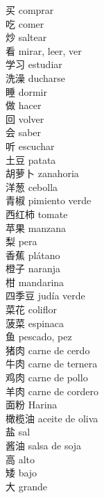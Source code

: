 \documentclass[13pt]{article}
\begin{document}

\begin{CJK*}{UTF8}{gkai}
\begin{multicols}{2}
\begin{pinyinscope}
\LARGE
\noindent
买 \quad comprar\\
吃 \quad comer\\
炒 \quad saltear\\
看 \quad mirar, leer, ver\\
学习 \quad estudiar\\
洗澡 \quad ducharse\\
睡 \quad dormir\\
做 \quad hacer\\
回 \quad volver\\
会 \quad saber\\
听 \quad escuchar\\
土豆 \quad patata\\
胡萝卜 \quad zanahoria\\
洋葱 \quad cebolla\\
青椒 \quad pimiento verde\\
西红柿 \quad tomate\\
苹果 \quad manzana\\
梨 \quad pera\\
香蕉 \quad plátano\\
橙子 \quad naranja\\
柑 \quad mandarina\\
四季豆 \quad judía verde\\
菜花 \quad coliflor\\
菠菜 \quad espinaca\\
鱼 \quad pescado, pez\\
猪肉 \quad carne de cerdo\\
牛肉 \quad carne de ternera\\
鸡肉 \quad carne de pollo\\
羊肉 \quad carne de cordero\\
面粉 \quad Harina\\
橄榄油 \quad aceite de oliva\\
盐 \quad sal\\
酱油 \quad salsa de soja\\
高 \quad alto\\
矮 \quad bajo\\
大 \quad grande\\

\end{pinyinscope}
\end{multicols}
\end{CJK*}
\end{document}
